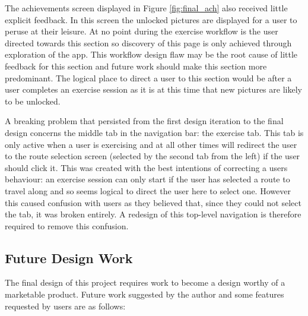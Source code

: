 The achievements screen displayed in Figure \ref{fig:final_ach} also
received little explicit feedback. In this screen the unlocked
pictures are displayed for a user to peruse at their leisure. At no
point during the exercise workflow is the user directed towards this
section so discovery of this page is only achieved through exploration
of the app. This workflow design flaw may be the root cause of little
feedback for this section and future work should make this section
more predominant. The logical place to direct a user to this section
would be after a user completes an exercise session as it is at this
time that new pictures are likely to be unlocked. 

A breaking problem that persisted from the first design iteration to
the final design concerns the middle tab in the navigation bar: the
exercise tab. This tab is only active when a user is exercising and at
all other times will redirect the user to the route selection screen
(selected by the second tab from the left) if the user should click
it. This was created with the best intentions of correcting a users
behaviour: an exercise session can only start if the user has selected
a route to travel along and so seems logical to direct the user here
to select one. However this caused confusion with users as they
believed that, since they could not select the tab, it was broken
entirely. A redesign of this top-level navigation is therefore
required to remove this confusion.

\subsection{Future Design Work}
The final design of this project requires work to become a design
worthy of a marketable product. Future work suggested by the author
and some features requested by users are as follows:

